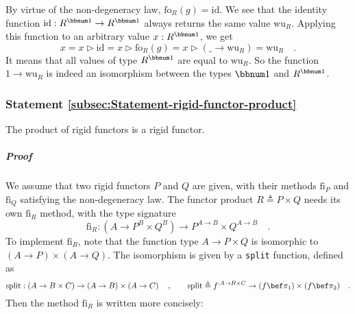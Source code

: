 By virtue of the non-degeneracy law, $\text{fo}_{R}(g)=\text{id}$.
We see that the identity function $\text{id}:R^{\bbnum 1}\rightarrow R^{\bbnum 1}$
always returns the same value $\text{wu}_{R}$. Applying this function
to an arbitrary value $x:R^{\bbnum 1}$, we get
\[
x=x\triangleright\text{id}=x\triangleright\text{fo}_{R}(g)=x\triangleright(\_\rightarrow\text{wu}_{R})=\text{wu}_{R}\quad.
\]
It means that all values of type $R^{\bbnum 1}$ are equal to $\text{wu}_{R}$.
So the function $1\rightarrow\text{wu}_{R}$ is indeed an isomorphism
between the types $\bbnum 1$ and $R^{\bbnum 1}$.

\subsubsection{Statement \label{subsec:Statement-rigid-functor-product}\ref{subsec:Statement-rigid-functor-product}}

The product of rigid functors is a rigid functor.

\subparagraph{Proof}

We assume that two rigid functors $P$ and $Q$ are given, with their
methods $\text{fi}_{P}$ and $\text{fi}_{Q}$ satisfying the non-degeneracy
law. The functor product $R\triangleq P\times Q$ needs its own $\text{fi}_{R}$
method, with the type signature
\[
\text{fi}_{R}:(A\rightarrow P^{B}\times Q^{B})\rightarrow P^{A\rightarrow B}\times Q^{A\rightarrow B}\quad.
\]
To implement $\text{fi}_{R}$, note that the function type $A\rightarrow P\times Q$
is isomorphic to $\left(A\rightarrow P\right)\times\left(A\rightarrow Q\right)$.
The isomorphism is given by a \lstinline!split! function, defined
as
\[
\text{split}:\left(A\rightarrow B\times C\right)\rightarrow\left(A\rightarrow B\right)\times\left(A\rightarrow C\right)\quad,\quad\quad\text{split}\triangleq f^{:A\rightarrow B\times C}\rightarrow(f\bef\pi_{1})\times(f\bef\pi_{2})\quad.
\]
Then the method $\text{fi}_{R}$ is written more concisely:

